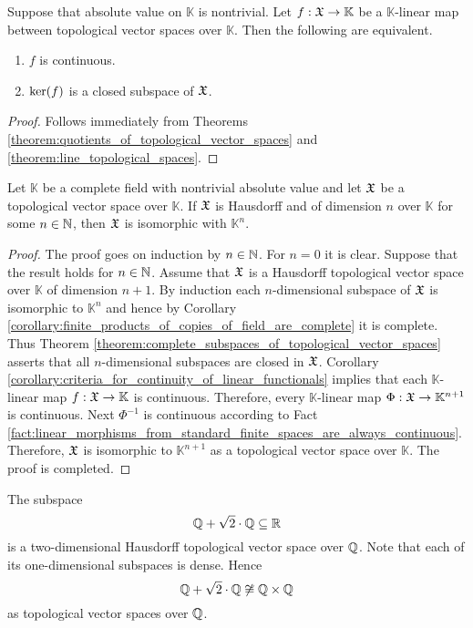 \begin{corollary}\label{corollary:criteria_for_continuity_of_linear_functionals}
Suppose that absolute value on $\mathbb{K}$ is nontrivial. Let $f:{\mathfrak X} \rightarrow \mathbb{K}$ be a $\mathbb{K}$-linear map between topological vector spaces over $\mathbb{K}$. Then the following are equivalent.
\begin{enumerate}[label=\emph{\textbf{(\roman*)}}, leftmargin=*]
\item $f$ is continuous.
\item $\mathrm{ker}(f)$ is a closed subspace of ${\mathfrak X}$.
\end{enumerate}
\end{corollary}
\begin{proof}
Follows immediately from Theorems \ref{theorem:quotients_of_topological_vector_spaces} and \ref{theorem:line_topological_spaces}.
\end{proof}

\begin{theorem}\label{theorem:uniqueness_of_finite_dimensional_Hausdorff_top_vec_spaces}
Let $\mathbb{K}$ be a complete field with nontrivial absolute value and let ${\mathfrak X}$ be a topological vector space over $\mathbb{K}$. If ${\mathfrak X}$ is Hausdorff and of dimension $n$ over $\mathbb{K}$ for some $n\in {\mathbb N}$, then ${\mathfrak X}$ is isomorphic with $\mathbb{K}^n$.
\end{theorem}
\begin{proof}
The proof goes on induction by $n\in {\mathbb N}$. For $n = 0$ it is clear. Suppose that the result holds for $n \in {\mathbb N}$. Assume that ${\mathfrak X}$ is a Hausdorff topological vector space over $\mathbb{K}$ of dimension $n + 1$. By induction each $n$-dimensional subspace of ${\mathfrak X}$ is isomorphic to $\mathbb{K}^n$ and hence by Corollary \ref{corollary:finite_products_of_copies_of_field_are_complete} it is complete. Thus Theorem \ref{theorem:complete_subspaces_of_topological_vector_spaces} asserts that all $n$-dimensional subspaces are closed in ${\mathfrak X}$. Corollary \ref{corollary:criteria_for_continuity_of_linear_functionals} implies that each $\mathbb{K}$-linear map $f:{\mathfrak X}\rightarrow \mathbb{K}$ is continuous. Therefore, every $\mathbb{K}$-linear map $\Phi:{\mathfrak X} \rightarrow \mathbb{K}^{n+1}$ is continuous. Next $\Phi^{-1}$ is continuous according to Fact \ref{fact:linear_morphisms_from_standard_finite_spaces_are_always_continuous}. Therefore, ${\mathfrak X}$ is isomorphic to $\mathbb{K}^{n+1}$ as a topological vector space over $\mathbb{K}$. The proof is completed.
\end{proof}

\begin{example}\label{example:two_dimensional_top_vec_space_over_rationals_which_is_not_square_of_rationals}
The subspace
$${\mathbb Q} + \sqrt{2}\cdot {\mathbb Q}\subseteq {\mathbb R}$$
is a two-dimensional Hausdorff topological vector space over ${\mathbb Q}$. Note that each of its one-dimensional subspaces is dense. Hence
$${\mathbb Q} + \sqrt{2}\cdot {\mathbb Q} \not \cong {\mathbb Q}\times {\mathbb Q}$$
as topological vector spaces over ${\mathbb Q}$.
\end{example}

